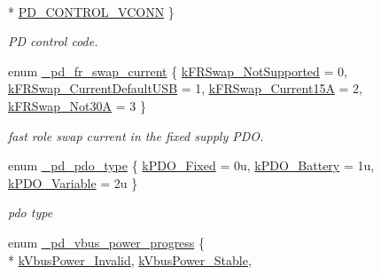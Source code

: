 \begin{DoxyCompactItemize}
\\*
\hyperlink{group__usb__pd__stack_gga0edd2a390d28d96646bc71aac1858af1a62e8479d23bf1208d5735aa76ff2aef6}{P\-D\-\_\-\-C\-O\-N\-T\-R\-O\-L\-\_\-\-V\-C\-O\-N\-N}
 \}
\begin{DoxyCompactList}\small\item\em P\-D control code. \end{DoxyCompactList}\item 
enum \hyperlink{group__usb__pd__stack_ga2cce3e21dbed22affd462b139a25889f}{\-\_\-pd\-\_\-fr\-\_\-swap\-\_\-current} \{ \hyperlink{group__usb__pd__stack_gga2cce3e21dbed22affd462b139a25889fa220c392960593725460ba31d5d918933}{k\-F\-R\-Swap\-\_\-\-Not\-Supported} = 0, 
\hyperlink{group__usb__pd__stack_gga2cce3e21dbed22affd462b139a25889fa8c5c8b5dc2ba25ed160cfd3d6447e917}{k\-F\-R\-Swap\-\_\-\-Current\-Default\-U\-S\-B} = 1, 
\hyperlink{group__usb__pd__stack_gga2cce3e21dbed22affd462b139a25889fa66d46326a35ff4e57816eaa439fd2eb9}{k\-F\-R\-Swap\-\_\-\-Current15\-A} = 2, 
\hyperlink{group__usb__pd__stack_gga2cce3e21dbed22affd462b139a25889fa1068510e7639b8568a7686a2e3e13e14}{k\-F\-R\-Swap\-\_\-\-Not30\-A} = 3
 \}
\begin{DoxyCompactList}\small\item\em fast role swap current in the fixed supply P\-D\-O. \end{DoxyCompactList}\item 
enum \hyperlink{group__usb__pd__stack_gab9f5d08f382b92b55a7f5f224a231dc9}{\-\_\-pd\-\_\-pdo\-\_\-type} \{ \hyperlink{group__usb__pd__stack_ggab9f5d08f382b92b55a7f5f224a231dc9a92d0f35b314a01e880e257e5af3c9e62}{k\-P\-D\-O\-\_\-\-Fixed} = 0u, 
\hyperlink{group__usb__pd__stack_ggab9f5d08f382b92b55a7f5f224a231dc9a42f5a5c21d0523dca99c8e14b2ec23a0}{k\-P\-D\-O\-\_\-\-Battery} = 1u, 
\hyperlink{group__usb__pd__stack_ggab9f5d08f382b92b55a7f5f224a231dc9ab2765d7b98d6e0922c4937be6d2ab618}{k\-P\-D\-O\-\_\-\-Variable} = 2u
 \}
\begin{DoxyCompactList}\small\item\em pdo type \end{DoxyCompactList}\item 
enum \hyperlink{group__usb__pd__stack_ga1af9af0106a9413093f8e0d9b796771b}{\-\_\-pd\-\_\-vbus\-\_\-power\-\_\-progress} \{ \\*
\hyperlink{group__usb__pd__stack_gga1af9af0106a9413093f8e0d9b796771babd57680a848fb2ffdfcb7ce62b380348}{k\-Vbus\-Power\-\_\-\-Invalid}, 
\hyperlink{group__usb__pd__stack_gga1af9af0106a9413093f8e0d9b796771badc5ad96f1d56cc3354757de9aea78896}{k\-Vbus\-Power\-\_\-\-Stable}, 

\end{DoxyCompactItemize}
